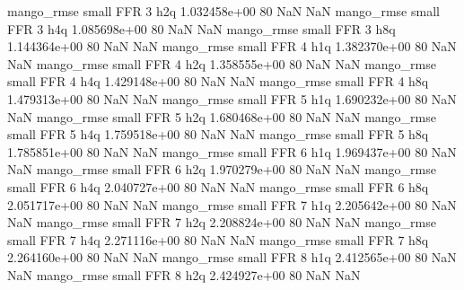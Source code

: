        mango_rmse      small      FFR                 3                  h2q 1.032458e+00 80            NaN                NaN
       mango_rmse      small      FFR                 3                  h4q 1.085698e+00 80            NaN                NaN
       mango_rmse      small      FFR                 3                  h8q 1.144364e+00 80            NaN                NaN
       mango_rmse      small      FFR                 4                  h1q 1.382370e+00 80            NaN                NaN
       mango_rmse      small      FFR                 4                  h2q 1.358555e+00 80            NaN                NaN
       mango_rmse      small      FFR                 4                  h4q 1.429148e+00 80            NaN                NaN
       mango_rmse      small      FFR                 4                  h8q 1.479313e+00 80            NaN                NaN
       mango_rmse      small      FFR                 5                  h1q 1.690232e+00 80            NaN                NaN
       mango_rmse      small      FFR                 5                  h2q 1.680468e+00 80            NaN                NaN
       mango_rmse      small      FFR                 5                  h4q 1.759518e+00 80            NaN                NaN
       mango_rmse      small      FFR                 5                  h8q 1.785851e+00 80            NaN                NaN
       mango_rmse      small      FFR                 6                  h1q 1.969437e+00 80            NaN                NaN
       mango_rmse      small      FFR                 6                  h2q 1.970279e+00 80            NaN                NaN
       mango_rmse      small      FFR                 6                  h4q 2.040727e+00 80            NaN                NaN
       mango_rmse      small      FFR                 6                  h8q 2.051717e+00 80            NaN                NaN
       mango_rmse      small      FFR                 7                  h1q 2.205642e+00 80            NaN                NaN
       mango_rmse      small      FFR                 7                  h2q 2.208824e+00 80            NaN                NaN
       mango_rmse      small      FFR                 7                  h4q 2.271116e+00 80            NaN                NaN
       mango_rmse      small      FFR                 7                  h8q 2.264160e+00 80            NaN                NaN
       mango_rmse      small      FFR                 8                  h1q 2.412565e+00 80            NaN                NaN
       mango_rmse      small      FFR                 8                  h2q 2.424927e+00 80            NaN                NaN
